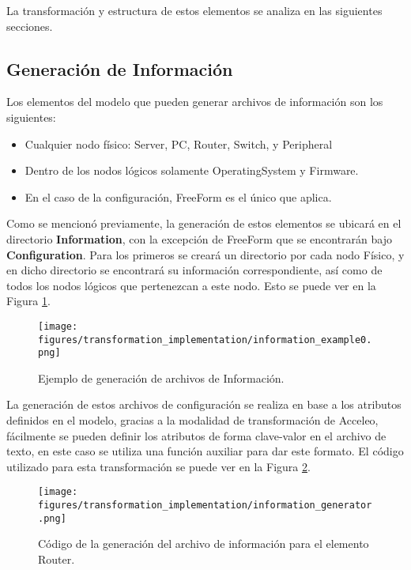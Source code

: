 La transformación y estructura de estos elementos se analiza en las siguientes secciones.

\subsection{Generación de Información}
Los elementos del modelo que pueden generar archivos de información son los siguientes:
\begin{itemize}
    \item Cualquier nodo físico: Server, PC, Router, Switch, y Peripheral
    \item Dentro de los nodos lógicos solamente OperatingSystem y Firmware.
    \item En el caso de la configuración, FreeForm es el único que aplica.
\end{itemize}

Como se mencionó previamente, la generación de estos elementos se ubicará en el directorio \textbf{Information}, con la excepción de FreeForm que se encontrarán bajo \textbf{Configuration}. Para los primeros se creará un directorio por cada nodo Físico, y en dicho directorio se encontrará su información correspondiente, así como de todos los nodos lógicos que pertenezcan a este nodo. Esto se puede ver en la Figura \ref{fig:transformation:information_example}.

\begin{figure}[htbp]
    \centering
    \texttt{[image: figures/transformation\_implementation/information\_example0.png]}
    \caption{Ejemplo de generación de archivos de Información.}
    \label{fig:transformation:information_example}
\end{figure}

La generación de estos archivos de configuración se realiza en base a los atributos definidos en el modelo, gracias a la modalidad de transformación de Acceleo, fácilmente se pueden definir los atributos de forma clave-valor en el archivo de texto, en este caso se utiliza una función auxiliar para dar este formato. El código utilizado para esta transformación se puede ver en la Figura \ref{fig:transformation:generator}.

\begin{figure}[htbp]
    \centering
    \texttt{[image: figures/transformation\_implementation/information\_generator.png]}
    \caption{Código de la generación del archivo de información para el elemento Router.}
    \label{fig:transformation:generator}
\end{figure}

